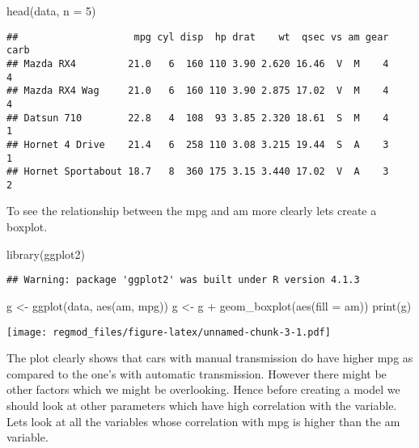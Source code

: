 \documentclass[
]{article}
\newenvironment{Shaded}{\begin{snugshade}}{\end{snugshade}}
\newcommand{\AttributeTok}[1]{\textcolor[rgb]{0.77,0.63,0.00}{#1}}
\newcommand{\DecValTok}[1]{\textcolor[rgb]{0.00,0.00,0.81}{#1}}
\newcommand{\FunctionTok}[1]{\textcolor[rgb]{0.00,0.00,0.00}{#1}}
\newcommand{\NormalTok}[1]{#1}
\newcommand{\OtherTok}[1]{\textcolor[rgb]{0.56,0.35,0.01}{#1}}
\newcommand{\SpecialCharTok}[1]{\textcolor[rgb]{0.00,0.00,0.00}{#1}}
\begin{document}
\begin{Shaded}
\begin{Highlighting}[]
\FunctionTok{head}\NormalTok{(data, }\AttributeTok{n =} \DecValTok{5}\NormalTok{)}
\end{Highlighting}
\end{Shaded}

\begin{verbatim}
##                    mpg cyl disp  hp drat    wt  qsec vs am gear carb
## Mazda RX4         21.0   6  160 110 3.90 2.620 16.46  V  M    4    4
## Mazda RX4 Wag     21.0   6  160 110 3.90 2.875 17.02  V  M    4    4
## Datsun 710        22.8   4  108  93 3.85 2.320 18.61  S  M    4    1
## Hornet 4 Drive    21.4   6  258 110 3.08 3.215 19.44  S  A    3    1
## Hornet Sportabout 18.7   8  360 175 3.15 3.440 17.02  V  A    3    2
\end{verbatim}

To see the relationship between the mpg and am more clearly lets create
a boxplot.

\begin{Shaded}
\begin{Highlighting}[]
\FunctionTok{library}\NormalTok{(ggplot2)}
\end{Highlighting}
\end{Shaded}

\begin{verbatim}
## Warning: package 'ggplot2' was built under R version 4.1.3
\end{verbatim}

\begin{Shaded}
\begin{Highlighting}[]
\NormalTok{g }\OtherTok{\textless{}{-}} \FunctionTok{ggplot}\NormalTok{(data, }\FunctionTok{aes}\NormalTok{(am, mpg))}
\NormalTok{g }\OtherTok{\textless{}{-}}\NormalTok{ g }\SpecialCharTok{+} \FunctionTok{geom\_boxplot}\NormalTok{(}\FunctionTok{aes}\NormalTok{(}\AttributeTok{fill =}\NormalTok{ am))}
\FunctionTok{print}\NormalTok{(g)}
\end{Highlighting}
\end{Shaded}

\texttt{[image: regmod\_files/figure-latex/unnamed-chunk-3-1.pdf]}

The plot clearly shows that cars with manual transmission do have higher
mpg as compared to the one's with automatic transmission. However there
might be other factors which we might be overlooking. Hence before
creating a model we should look at other parameters which have high
correlation with the variable. Lets look at all the variables whose
correlation with mpg is higher than the am variable.
\end{document}
